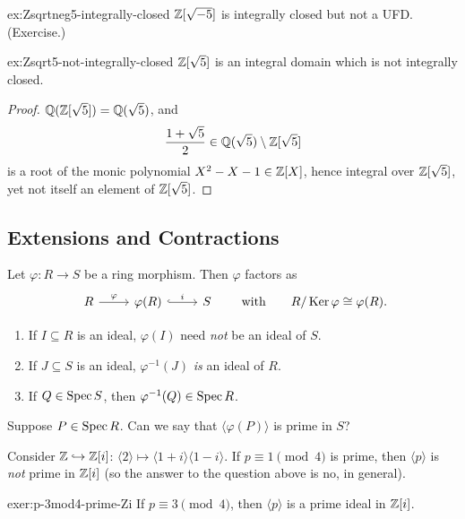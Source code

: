 \begin{example}{}{ex:Zsqrtneg5-integrally-closed}
$\mathbb{Z}[\sqrt{-5}]$ is integrally closed but not a UFD. (Exercise.)
\end{example}

\begin{example}{}{ex:Zsqrt5-not-integrally-closed}
$\mathbb{Z}[\sqrt5]$ is an integral domain which is not integrally closed.
\end{example}

\begin{proof}
$\mathbb{Q}(\mathbb{Z}[\sqrt5]) = \mathbb{Q}(\sqrt5)$, and
\[
\frac{1+\sqrt5}{2} \in \mathbb{Q}(\sqrt5) \setminus \mathbb{Z}[\sqrt5]
\]
is a root of the monic polynomial $X^2-X-1 \in \mathbb{Z}[X]$, hence integral over $\mathbb{Z}[\sqrt5]$, yet not itself an element of $\mathbb{Z}[\sqrt5]$.
\end{proof}

\subsection*{Extensions and Contractions}

Let $\varphi: R \to S$ be a ring morphism. Then $\varphi$ factors as
\[
\begin{tikzcd}
R \arrow[r, "\varphi"] & \varphi(R) \arrow[r, hook, "i"] & S
\end{tikzcd}
\qquad \text{with} \qquad R/\Ker\varphi \cong \varphi(R).
\]

\begin{enumerate}[label=(\arabic*)]
    \item If $I \subseteq R$ is an ideal, $\varphi(I)$ need \emph{not} be an ideal of $S$.
    \item If $J \subseteq S$ is an ideal, $\varphi^{-1}(J)$ \emph{is} an ideal of $R$.
    \item If $Q \in \operatorname{Spec} S$, then $\varphi^{-1}(Q) \in \operatorname{Spec} R$.
\end{enumerate}

\begin{question}
Suppose $P \in \operatorname{Spec} R$. Can we say that $\langle \varphi(P) \rangle$ is prime in $S$?
\end{question}

Consider $\mathbb{Z} \hookrightarrow \mathbb{Z}[i]$: $\langle 2 \rangle \mapsto \langle 1+i \rangle \langle 1-i \rangle$. If $p \equiv 1 \pmod 4$ is prime, then $\langle p \rangle$ is \emph{not} prime in $\mathbb{Z}[i]$ (so the answer to the question above is no, in general).

\begin{exercise}{}{exer:p-3mod4-prime-Zi}
If $p \equiv 3 \pmod 4$, then $\langle p \rangle$ is a prime ideal in $\mathbb{Z}[i]$.
\end{exercise}

